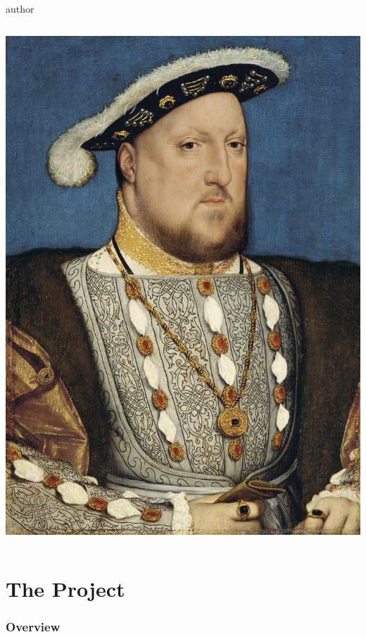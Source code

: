 \documentclass[english,handout]{beamer}
\begin{document}
\begin{frame}
\begin{beamercolorbox}[leftskip=8cm,center,wd=0.7\textwidth]{author}
\begin{columns}[T]
\begin{column}{.30\textwidth}
				 \includegraphics[width=\linewidth]{imagenes/henry_viii.jpg}
				\end{column}
				\end{columns}
				\end{beamercolorbox}
				
	\end{frame}

\section{The Project}
\begin{frame}
	\frametitle{Overview}
\end{frame}
\end{document}
